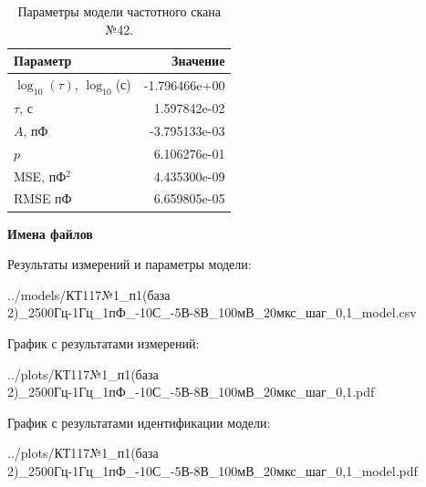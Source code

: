 \begin{table}[!ht]
    \centering
    \caption{Параметры модели частотного скана №42.}
    \begin{tabular}{|l|r|}
        \hline
        Параметр                                       & Значение                  \\ \hline
        $\log_{10}(\tau)$, $\log_{10}$(с)              & -1.796466e+00             \\ \hline
        $\tau$, с                                      & 1.597842e-02              \\ \hline
        $A$, пФ                                        & -3.795133e-03             \\ \hline
        $p$                                            & 6.106276e-01              \\ \hline
        MSE, пФ$^2$                                    & 4.435300e-09              \\ \hline
        RMSE пФ                                        & 6.659805e-05              \\ \hline
    \end{tabular}
    \label{table:frequency_scan_model_42}
\end{table}

\textbf{Имена файлов}

Результаты измерений и параметры модели:

\scriptsize../models/КТ117№1\_п1(база 2)\_2500Гц-1Гц\_1пФ\_-10С\_-5В-8В\_100мВ\_20мкс\_шаг\_0,1\_model.csv
\normalsize

График с результатами измерений:

\scriptsize../plots/КТ117№1\_п1(база 2)\_2500Гц-1Гц\_1пФ\_-10С\_-5В-8В\_100мВ\_20мкс\_шаг\_0,1.pdf
\normalsize

График с результатами идентификации модели:

\scriptsize../plots/КТ117№1\_п1(база 2)\_2500Гц-1Гц\_1пФ\_-10С\_-5В-8В\_100мВ\_20мкс\_шаг\_0,1\_model.pdf
\normalsize

